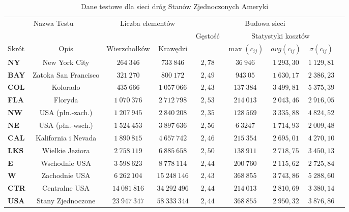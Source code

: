\begin{table}[h]
\centering
\begin{tabular}{lcccccccc}
\hline
\multicolumn{2}{c|}{\multirow{2}{*}{Nazwa Testu}} & \multicolumn{2}{c|}{\multirow{2}{*}{Liczba elementów}} & \multicolumn{4}{c}{Budowa sieci} &  \\ \cline{5-9}
\multicolumn{2}{l|}{} & \multicolumn{2}{c|}{} & \multirow{2}{*}{Gęstość} & \multicolumn{3}{|c}{Statystyki kosztów} &  \\ \cline{1-4} \cline{6-9}
\multicolumn{1}{l|}{Skrót} & \multicolumn{1}{c|}{Opis} & \multicolumn{1}{c|}{Wierzchołków} & \multicolumn{1}{c|}{Krawędzi} & & \multicolumn{1}{|c}{$\max \left( c_{ij} \right) $} & \multicolumn{1}{|c}{$ avg \left( c_{ij} \right) $} & \multicolumn{1}{|c}{$\sigma \left( c_{ij} \right) $} &  \\
\hline
\textbf{NY} & New York City &  $264~346$ &  $733~846$ & $2,78$ & $36~946$ & $1~293,30$ & $1~129,81$ &  \\
\textbf{BAY} & Zatoka San Francisco &  $321~270$ &  $800~172$ & $2,49$ & $943~05$ & $1~630,17$ & $2~386,23$ &  \\
\textbf{COL} & Kolorado &  $435~666$ &  $1~057~066$ & $2,43$ & $137~384$ & $3~499,81$ & $5~375,39$ &  \\
\textbf{FLA} & Floryda &  $1~070~376$ & $2~712~798$ & $2,53$ & $214~013$ & $2~043,46$ & $2~916,05$ &  \\
\textbf{NW} & USA (płn.-zach.) & $1~207~945$ & $2~840~208$ & $2,35$ & $128~569$ & $3~335,88$ & $4~824,52$ &  \\
\textbf{NE} & USA (płn.-wsch.) & $1~524~453$ & $3~897~636$ & $2,56$ & $6~3247$ & $1~714,93$ & $2~009,48$ &  \\
\textbf{CAL} & Kalifornia i Nevada & $1~890~815$ & $4~657~742$ & $2,46$ & $215~354$ & $2~695,01$ & $4~270,10$ &  \\
\textbf{LKS} & Wielkie Jeziora & $2~758~119$ & $6~885~658$ & $2,50$ & $138~911$ & $2~718,75$ & $3~450,13$ &  \\
\textbf{E} & Wschodnie USA & $3~598~623$ & $8~778~114$ & $2,44$ & $200~760$ & $2~115,62$ & $2~725,84$ &  \\
\textbf{W} & Zachodnie USA & $6~262~104$ & $15~248~146$ & $2,43$ & $368~855$ & $3~743,86$ & $5~288,60$ &  \\
\textbf{CTR} & Centralne USA & $14~081~816$ & $34~292~496$ & $2,44$ & $214~013$ & $2~810,69$ & $3~380,14$ &  \\
\textbf{USA} & Stany Zjednoczone & $23~947~347$ & $58~333~344$ & $2,44$ & $368~855$ & $2~950,32$ & $3~876,86$ &  \\
\hline
\end{tabular}
\caption{Dane testowe dla sieci dróg Stanów Zjednoczonych Ameryki}
\label{tab:USARoad}
\end{table}

